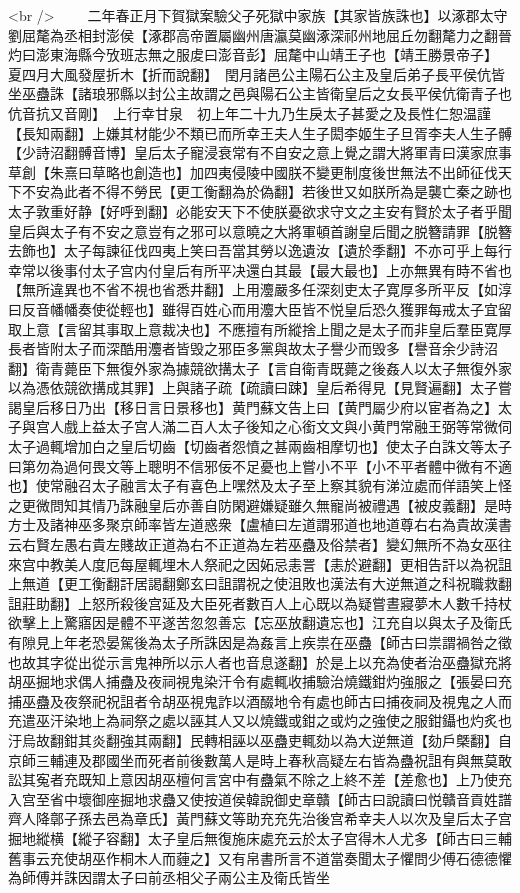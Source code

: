 <br />
　　二年春正月下賀獄案驗父子死獄中家族【其家皆族誅也】以涿郡太守劉屈氂為丞相封澎侯【涿郡高帝置屬幽州唐瀛莫幽涿深祁州地屈丘勿翻氂力之翻晉灼曰澎東海縣今攷班志無之服䖍曰澎音彭】屈氂中山靖王子也【靖王勝景帝子】　夏四月大風發屋折木【折而說翻】　閏月諸邑公主陽石公主及皇后弟子長平侯伉皆坐巫蠱誅【諸琅邪縣以封公主故謂之邑與陽石公主皆衛皇后之女長平侯伉衛青子也伉音抗又音剛】　上行幸甘泉　初上年二十九乃生戾太子甚愛之及長性仁恕温謹【長知兩翻】上嫌其材能少不類已而所幸王夫人生子閎李姬生子旦胥李夫人生子髆【少詩沼翻髆音博】皇后太子寵浸衰常有不自安之意上覺之謂大將軍青曰漢家庶事草創【朱熹曰草略也創造也】加四夷侵陵中國朕不變更制度後世無法不出師征伐天下不安為此者不得不勞民【更工衡翻為於偽翻】若後世又如朕所為是襲亡秦之跡也太子敦重好静【好呼到翻】必能安天下不使朕憂欲求守文之主安有賢於太子者乎聞皇后與太子有不安之意豈有之邪可以意曉之大將軍頓首謝皇后聞之脱簪請罪【脱簪去飾也】太子每諫征伐四夷上笑曰吾當其勞以逸遺汝【遺於季翻】不亦可乎上每行幸常以後事付太子宫内付皇后有所平决還白其最【最大最也】上亦無異有時不省也【無所違異也不省不視也省悉井翻】上用灋嚴多任深刻吏太子寛厚多所平反【如淳曰反音幡幡奏使從輕也】雖得百姓心而用灋大臣皆不悦皇后恐久獲罪每戒太子宜留取上意【言留其事取上意裁决也】不應擅有所縱捨上聞之是太子而非皇后羣臣寛厚長者皆附太子而深酷用灋者皆毁之邪臣多黨與故太子譽少而毁多【譽音余少詩沼翻】衛青薨臣下無復外家為據競欲搆太子【言自衛青既薨之後姦人以太子無復外家以為憑依競欲搆成其罪】上與諸子疏【疏讀曰踈】皇后希得見【見賢遍翻】太子嘗謁皇后移日乃出【移日言日景移也】黄門蘇文告上曰【黄門屬少府以宦者為之】太子與宫人戲上益太子宫人滿二百人太子後知之心銜文文與小黄門常融王弼等常微伺太子過輒增加白之皇后切齒【切齒者怨憤之甚兩齒相摩切也】使太子白誅文等太子曰第勿為過何畏文等上聰明不信邪佞不足憂也上嘗小不平【小不平者體中微有不適也】使常融召太子融言太子有喜色上嘿然及太子至上察其貌有涕泣處而佯語笑上怪之更微問知其情乃誅融皇后亦善自防閑避嫌疑雖久無寵尚被禮遇【被皮義翻】是時方士及諸神巫多聚京師率皆左道惑衆【盧植曰左道謂邪道也地道尊右右為貴故漢書云右賢左愚右貴左賤故正道為右不正道為左若巫蠱及俗禁者】變幻無所不為女巫往來宫中教美人度厄每屋輒埋木人祭祀之因妬忌恚詈【恚於避翻】更相告訐以為祝詛上無道【更工衡翻訐居謁翻鄭玄曰詛謂祝之使沮敗也漢法有大逆無道之科祝職救翻詛莊助翻】上怒所殺後宫延及大臣死者數百人上心既以為疑嘗晝寢夢木人數千持杖欲擊上上驚寤因是體不平遂苦忽忽善忘【忘巫放翻遺忘也】江充自以與太子及衛氏有隙見上年老恐晏駕後為太子所誅因是為姦言上疾祟在巫蠱【師古曰祟謂禍咎之徵也故其字從出從示言鬼神所以示人者也音息遂翻】於是上以充為使者治巫蠱獄充將胡巫掘地求偶人捕蠱及夜祠視鬼染汗令有處輒收捕驗治燒鐵鉗灼強服之【張晏曰充捕巫蠱及夜祭祀祝詛者令胡巫視鬼詐以酒醊地令有處也師古曰捕夜祠及視鬼之人而充遣巫汗染地上為祠祭之處以誣其人又以燒鐵或鉗之或灼之強使之服鉗鑷也灼炙也汙烏故翻鉗其炎翻強其兩翻】民轉相誣以巫蠱吏輒劾以為大逆無道【劾戶槩翻】自京師三輔連及郡國坐而死者前後數萬人是時上春秋高疑左右皆為蠱祝詛有與無莫敢訟其寃者充既知上意因胡巫檀何言宮中有蠱氣不除之上終不差【差愈也】上乃使充入宫至省中壞御座掘地求蠱又使按道侯韓說御史章贛【師古曰說讀曰悦贛音貢姓譜齊人降鄣子孫去邑為章氏】黃門蘇文等助充充先治後宫希幸夫人以次及皇后太子宫掘地縱横【縱子容翻】太子皇后無復施床處充云於太子宫得木人尤多【師古曰三輔舊事云充使胡巫作桐木人而薶之】又有帛書所言不道當奏聞太子懼問少傅石德德懼為師傅并誅因謂太子曰前丞相父子兩公主及衛氏皆坐